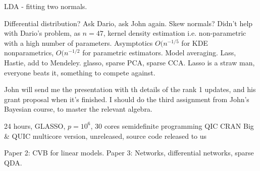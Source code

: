 \documentclass{amsart}
\begin{document}
LDA - fitting two normals.

Differential distribution? Ask Dario, ask John again.
Skew normals? Didn't help with Dario's problem, as $n=47$, kernel density estimation i.e. non-parametric with
a high number of parameters.
Asymptotics $O(n^{-1/5}$ for KDE nonparametrics, $O(n^{-1/2}$ for parametric estimators.
Model averaging.
Lass, Hastie, add to Mendeley. glasso, sparse PCA, sparse CCA.
Lasso is a straw man, everyone beats it, something to compete against.

John will send me the presentation with th details of the rank 1 updates, and his grant proposal when it's
finished.
I should do the third assignment from John's Bayesian course, to master the relevant algebra.

24 hours, GLASSO, $p=10^6$, 30 cores
semidefinite programming
QIC CRAN
Big \& QUIC multicore version, unreleased, source code released to us

Paper 2: CVB for linear models.
Paper 3: Networks, differential networks, sparse QDA.
\end{document}
